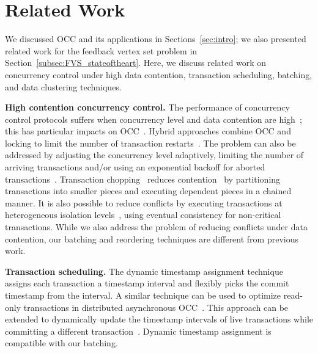 \section{Related Work}\label{sec:relwork}

We discussed OCC and its applications in Sections~\ref{sec:intro}; we also presented related work for the feedback vertex set problem in Section~\ref{subsec:FVS_stateoftheart}. Here, we discuss related work on concurrency control under high data contention, transaction scheduling, batching, and data clustering techniques.

{\bf High contention concurrency control.}
The performance of concurrency control protocols suffers when concurrency level and data contention are high~\cite{franaszek1985limitations}; this has particular impacts on OCC~\cite{agrawal1987concurrency}. Hybrid approaches combine OCC and locking to limit the number of transaction restarts~\cite{thomasian1998distributed,yu1992analysis}. The problem can also be addressed by adjusting the concurrency level adaptively, limiting the number of arriving transactions and/or using an exponential backoff for aborted transactions~\cite{helal1993adaptive}. Transaction chopping~\cite{shasha1995transaction} reduces contention~\cite{mu2014extracting,xie2015high} by partitioning transactions into smaller pieces and executing dependent pieces in a chained manner. It is also possible to reduce conflicts by executing transactions at heterogeneous isolation levels~\cite{xie2014salt,xie2015high}, using eventual consistency for non-critical transactions. While we also address the problem of reducing conflicts under data contention, our batching and reordering techniques are different from previous work.

{\bf Transaction scheduling.}
The dynamic timestamp assignment technique~\cite{bayer1982dynamic} assigns each transaction a timestamp interval and flexibly picks the commit timestamp from the interval. A similar technique can be used to optimize read-only transactions in distributed asynchronous OCC~\cite{ding2015centiman}. This approach can be extended to dynamically update the timestamp intervals of live transactions while committing a different transaction~\cite{boksenbaum1987concurrent}. Dynamic timestamp assignment is compatible with our batching.

